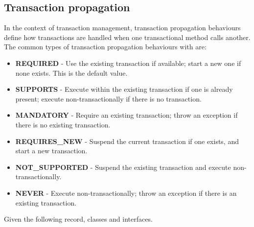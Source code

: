 \subsection{Transaction propagation}

In the context of transaction management, transaction propagation behaviours define how transactions are handled when one transactional method calls another. The common types of transaction propagation behaviours with are:
\begin{itemize}
\item \textbf{REQUIRED} - Use the existing transaction if available; start a new one if none exists. This is the default value.
\item \textbf{SUPPORTS} - Execute within the existing transaction if one is already present; execute non-transactionally if there is no transaction.
\item \textbf{MANDATORY} - Require an existing transaction; throw an exception if there is no existing transaction.
\item \textbf{REQUIRES_NEW} - Suspend the current transaction if one exists, and start a new transaction.
\item \textbf{NOT_SUPPORTED} - Suspend the existing transaction and execute non-transactionally.
\item \textbf{NEVER} - Execute non-transactionally; throw an exception if there is an existing transaction.
\end{itemize}


Given the following record, classes and interfaces.

